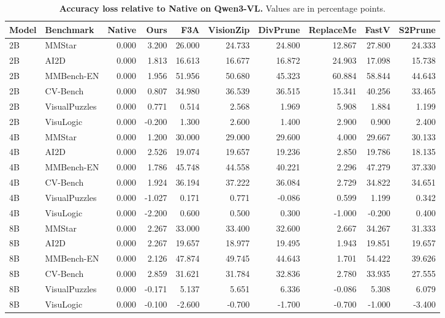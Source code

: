 \documentclass[10pt,a4paper,landscape]{article}
\begin{document}
\begin{table}[!ht]\centering
\caption{\textbf{Accuracy loss relative to Native on Qwen3-VL.} Values are in percentage points.}
\small
\begin{tabular}{@{}llrrrrrrrr@{}}\toprule
Model & Benchmark & Native & Ours & F3A & VisionZip & DivPrune & ReplaceMe & FastV & S2Prune\\\midrule
2B & MMStar & 0.000 & 3.200 & 26.000 & 24.733 & 24.800 & 12.867 & 27.800 & 24.333\\
2B & AI2D & 0.000 & 1.813 & 16.613 & 16.677 & 16.872 & 24.903 & 17.098 & 15.738\\
2B & MMBench-EN & 0.000 & 1.956 & 51.956 & 50.680 & 45.323 & 60.884 & 58.844 & 44.643\\
2B & CV-Bench & 0.000 & 0.807 & 34.980 & 36.539 & 36.515 & 15.341 & 40.256 & 33.465\\
2B & VisualPuzzles & 0.000 & 0.771 & 0.514 & 2.568 & 1.969 & 5.908 & 1.884 & 1.199\\
2B & VisuLogic & 0.000 & -0.200 & 1.300 & 2.600 & 1.400 & 2.900 & 0.900 & 2.400\\
\midrule
4B & MMStar & 0.000 & 1.200 & 30.000 & 29.000 & 29.600 & 4.000 & 29.667 & 30.133\\
4B & AI2D & 0.000 & 2.526 & 19.074 & 19.657 & 19.236 & 2.850 & 19.786 & 18.135\\
4B & MMBench-EN & 0.000 & 1.786 & 45.748 & 44.558 & 40.221 & 2.296 & 47.279 & 37.330\\
4B & CV-Bench & 0.000 & 1.924 & 36.194 & 37.222 & 36.084 & 2.729 & 34.822 & 34.651\\
4B & VisualPuzzles & 0.000 & -1.027 & 0.171 & 0.771 & -0.086 & 0.599 & 1.199 & 0.342\\
4B & VisuLogic & 0.000 & -2.200 & 0.600 & 0.500 & 0.300 & -1.000 & -0.200 & 0.400\\
\midrule
8B & MMStar & 0.000 & 2.267 & 33.000 & 33.400 & 32.600 & 2.667 & 34.267 & 31.333\\
8B & AI2D & 0.000 & 2.267 & 19.657 & 18.977 & 19.495 & 1.943 & 19.851 & 19.657\\
8B & MMBench-EN & 0.000 & 2.126 & 47.874 & 49.745 & 44.643 & 1.701 & 54.422 & 39.626\\
8B & CV-Bench & 0.000 & 2.859 & 31.621 & 31.784 & 32.836 & 2.780 & 33.935 & 27.555\\
8B & VisualPuzzles & 0.000 & -0.171 & 5.137 & 5.651 & 6.336 & -0.086 & 5.308 & 6.079\\
8B & VisuLogic & 0.000 & -0.100 & -2.600 & -0.700 & -1.700 & -0.700 & -1.000 & -3.400\\

\end{tabular}
\end{table}
\end{document}
